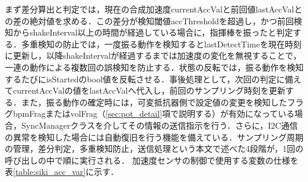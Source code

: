 \iffalse
まず差分算出と判定では，現在の合成加速度currentAccValと前回値lastAccValとの差の絶対値を求める．この差分が検知閾値accThresholdを超過し，かつ前回検知からshakeInterval以上の時間が経過している場合に，指揮棒を振ったと判定する．多重検知の防止では，一度振る動作を検知するとlastDetectTimeを現在時刻に更新し，以降shakeIntervalが経過するまでは加速度の変化を無視することで，一連の動作による複数回の誤検知を防止する．状態の反転では，振る動作を検知するたびにisStartedのbool値を反転させる．事後処理として，次回の判定に備えてcurrentAccValの値をlastAccValへ代入し，前回のサンプリング時刻を更新する．また，振る動作の確定時には，可変抵抗器側で設定値の変更を検知したフラグbpmFragまたはvolFrag（\ref{sec:pot_detail}項で説明する）が有効になっている場合，SyncManagerクラスを介してその情報の送信指示を行う．さらに，I2C通信の異常を検知した場合には自動復旧を行う機能を備えている．サンプリング周期の管理，差分判定，多重検知防止，送信処理という本文で述べた4段階が，1回の呼び出しの中で順に実行される．
加速度センサの制御で使用する変数の仕様を表\ref{table:siki_acc_var}に示す．

\FloatBarrier


